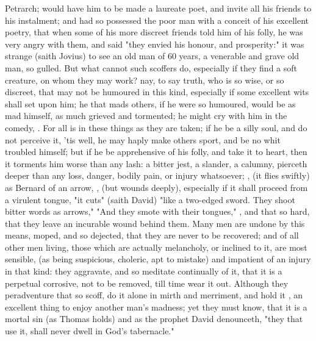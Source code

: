 Petrarch; would have him to be made a laureate poet, and invite all his friends
to his instalment; and had so possessed the poor man with a conceit of his
excellent poetry, that when some of his more discreet friends told him of his
folly, he was very angry with them, and said "they envied
his honour, and prosperity:" it was strange (saith Jovius) to see an old man of
60 years, a venerable and grave old man, so gulled. But what cannot such
scoffers do, especially if they find a soft creature, on whom they may work?
nay, to say truth, who is so wise, or so discreet, that may not be humoured in
this kind, especially if some excellent wits shall set upon him; he that mads
others, if he were so humoured, would be as mad himself, as much grieved and
tormented; he might cry with him in the comedy, . For all is in these things as they are taken; if he be a
silly soul, and do not perceive it, 'tis well, he may haply make others sport,
and be no whit troubled himself; but if he be apprehensive of his folly, and
take it to heart, then it torments him worse than any lash: a bitter jest, a
slander, a calumny, pierceth deeper than any loss, danger, bodily pain, or
injury whatsoever; , (it flies swiftly) as Bernard of an
arrow, , (but wounds deeply), especially if it shall
proceed from a virulent tongue, "it cuts" (saith David) "like a two-edged
sword. They shoot bitter words as arrows,"  "And
they smote with their tongues," , and that so
hard, that they leave an incurable wound behind them. Many men are undone by
this means, moped, and so dejected, that they are never to be recovered; and of
all other men living, those which are actually melancholy, or inclined to it,
are most sensible, (as being suspicious, choleric, apt to mistake) and
impatient of an injury in that kind: they aggravate, and so meditate
continually of it, that it is a perpetual corrosive, not to be removed, till
time wear it out. Although they peradventure that so scoff, do it alone in
mirth and merriment, and hold it , an excellent
thing to enjoy another man's madness; yet they must know, that it is a mortal
sin (as Thomas holds) and as the prophet
David denounceth, "they that use it, shall never dwell in
God's tabernacle."

